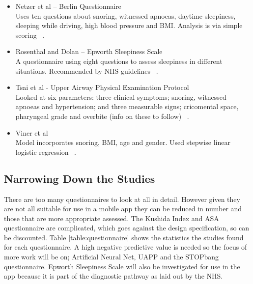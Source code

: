 \begin{itemize}
\item Netzer et al – Berlin Questionnaire \\
Uses ten questions about snoring, witnessed apnoeas, daytime sleepiness, sleeping while driving, high blood pressure and BMI. Analysis is via simple scoring ~\cite{netzer1999using}.
\item Rosenthal and Dolan – Epworth Sleepiness Scale \\
A questionnaire using eight questions to assess sleepiness in different situations. Recommended by NHS guidelines ~\cite{rosenthal2008epworth}.
\item Tsai et al - Upper Airway Physical Examination Protocol \\
Looked at six parameters: three clinical symptoms; snoring, witnessed apnoeas and hypertension; and three measurable signs; cricomental space, pharyngeal grade and overbite (info on these to follow) ~\cite{tsai2003decision}.
\item Viner et al\\ 
Model incorporates snoring, BMI, age and gender. Used stepwise linear logistic regression ~\cite{viner1991history}.
\end{itemize}

\subsection{Narrowing Down the Studies}
There are too many questionnaires to look at all in detail. However given they are not all suitable for use in a mobile app they can be reduced in number and those that are more appropriate assessed. The Kushida Index and ASA questionnaire are complicated, which goes against the design specification, so can be discounted. Table \ref{table:questionnaire} shows the statistics the studies found for each questionnaire. A high negative predictive value is needed so the focus of more work will be on; Artificial Neural Net, UAPP and the STOPbang questionnaire. Epworth Sleepiness Scale will also be investigated for use in the app because it is part of the diagnostic pathway as laid out by the NHS.

